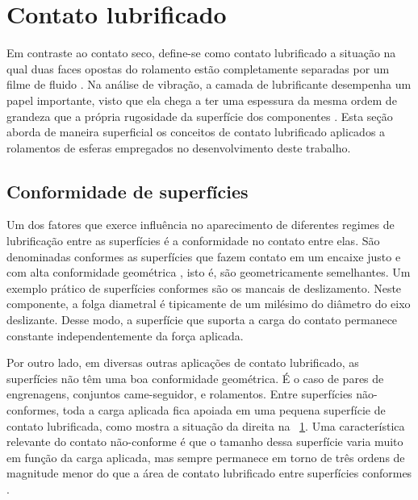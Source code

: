 \documentclass[12pt,oneside,english,brazil,lmodern,siglas,simbolos,cite=num]{ucsmonograph}
\begin{document}
	\section{Contato lubrificado}
	Em contraste ao contato seco, define-se como contato lubrificado a situação na qual duas faces opostas do rolamento estão completamente separadas por um filme de fluido \cite{hamrock:1991}.
	Na análise de vibração, a camada de lubrificante desempenha um papel importante, visto que ela chega a ter uma espessura da mesma ordem de grandeza que a própria rugosidade da superfície dos componentes \cite{sassi:2007}.
	Esta seção aborda de maneira superficial os conceitos de contato lubrificado aplicados a rolamentos de esferas empregados no desenvolvimento deste trabalho.
	
	\subsection{Conformidade de superfícies}
	Um dos fatores que exerce influência no aparecimento de diferentes regimes de lubrificação entre as superfícies é a conformidade no contato entre elas.
	São denominadas conformes as superfícies que fazem contato em um encaixe justo e com alta conformidade geométrica \cite{hamrock:1991}, isto é, são geometricamente semelhantes.
	Um exemplo prático de superfícies conformes são os mancais de deslizamento.
	Neste componente, a folga diametral é tipicamente de um milésimo do diâmetro do eixo deslizante.
	Desse modo, a superfície que suporta a carga do contato permanece constante independentemente da força aplicada.
	
	Por outro lado, em diversas outras aplicações de contato lubrificado, as superfícies não têm uma boa conformidade geométrica.
	É o caso de pares de engrenagens, conjuntos came-seguidor, e rolamentos.
	Entre superfícies não-conformes, toda a carga aplicada fica apoiada em uma pequena superfície de contato lubrificada, como mostra a situação da direita na \figurename\ \ref{fig:contato-conforme}.
	Uma característica relevante do contato não-conforme é que o tamanho dessa superfície varia muito em função da carga aplicada, mas sempre permanece em torno de três ordens de magnitude menor do que a área de contato lubrificado entre superfícies conformes \cite{hamrock:1991}.
	
	\begin{figure}[b]
		\label{fig:contato-conforme}
	\end{figure}
	
\end{document}
